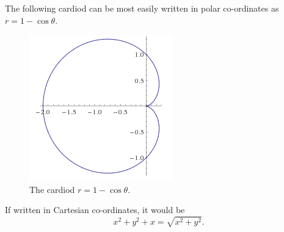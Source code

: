 \begin{example}
The following cardiod can be most easily written in polar co-ordinates as $r=1-\cos\theta$.
\begin{figure}[H]
    \includegraphics[scale=0.5]{img/1-costheta.png}
    \centering
  \caption{The cardiod $r=1-\cos\theta$.}
\end{figure}

If written in Cartesian co-ordinates, it would be \[x^2+y^2+x=\sqrt{x^2+y^2}.\]

\end{example}
